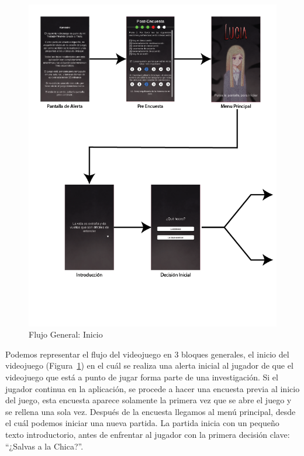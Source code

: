\begin{figure}[h!]
    \centering
    \includegraphics[scale=0.7]{imgs/general-chart-1.png}
    \caption{Flujo General: Inicio}
    \label{fig:chart-1}
\end{figure}

Podemos representar el flujo del videojuego en 3 bloques generales, el inicio del videojuego (Figura~\ref{fig:chart-1}) en el cuál se realiza una alerta inicial al jugador de que el videojuego que está a punto de jugar forma parte de una investigación. Si el jugador continua en la aplicación, se procede a hacer una encuesta previa al inicio del juego, esta encuesta aparece solamente la primera vez que se abre el juego y se rellena una sola vez. Después de la encuesta llegamos al menú principal, desde el cuál podemos iniciar una nueva partida. La partida inicia con un pequeño texto introductorio, antes de enfrentar al jugador con la primera decisión clave: ``¿Salvas a la Chica?''.

